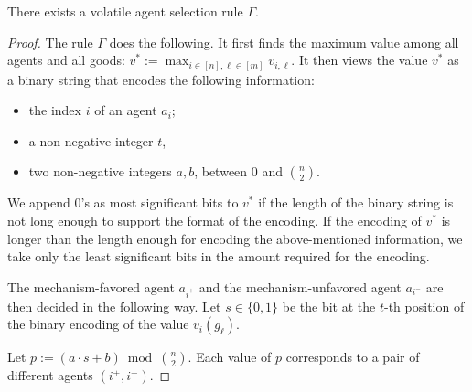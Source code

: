 \begin{propositionrep}
    There exists a volatile agent selection rule $\Gamma$.
\end{propositionrep}
\begin{proof}
    The rule $\Gamma$ does the following.
    It first finds the maximum value among all agents and all goods: $\displaystyle v^\ast := \max_{i\in[n],\ell\in[m]}v_{i,\ell}$.
    It then views the value $v^\ast$ as a binary string that encodes the following information:
    \begin{itemize}
        \item the index $i$ of an agent $a_i$;
        \item a non-negative integer $t$,
        \item two non-negative integers $a,b$, between $0$ and ${n \choose 2}$.
    \end{itemize}
    We append $0$'s as most significant bits to $v^\ast$ if the length of the binary string is not long enough to support the format of the encoding.
   If the encoding of $v^\ast$ is longer than the length enough for encoding the above-mentioned information, we take only the least significant bits in the amount required for the encoding.


   
    The mechanism-favored agent $a_{i^+}$ and the mechanism-unfavored agent $a_{i^-}$ are then decided in the following way.
    Let $s\in\{0,1\}$ be the bit at the $t$-th position of the binary encoding of the value $v_i(g_\ell)$.

    Let $p := (a\cdot s + b) \bmod {n \choose 2}$.
    Each value of $p$ corresponds to a pair of different agents $(i^+, i^-)$.
    


\end{proof}
